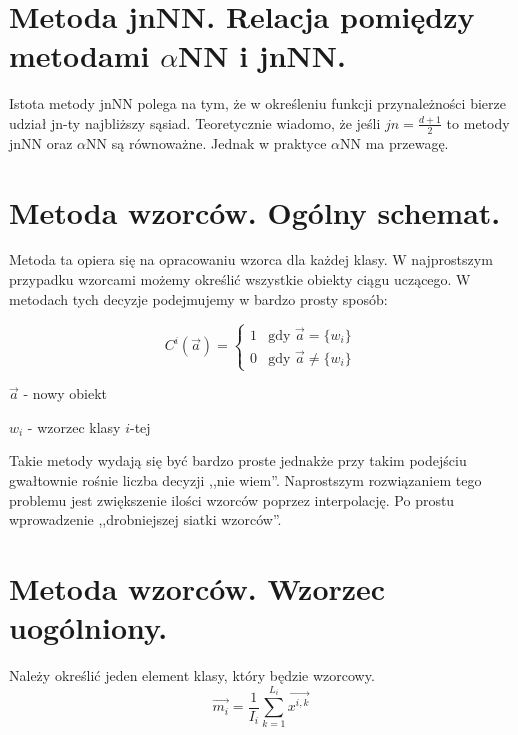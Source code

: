 \documentclass[a4paper,10pt]{article}
\begin{document}
\section{Metoda jnNN. Relacja pomiędzy metodami $\alpha$NN i jnNN.}
Istota metody jnNN polega na tym, że w określeniu funkcji przynależności bierze udział jn-ty najbliższy sąsiad. Teoretycznie wiadomo, że jeśli $jn=\frac{d+1}{2}$ to metody jnNN oraz $\alpha$NN są równoważne. Jednak w praktyce $\alpha$NN ma przewagę.

\section{Metoda wzorców. Ogólny schemat.}
Metoda ta opiera się na opracowaniu wzorca dla każdej klasy. W najprostszym przypadku wzorcami możemy określić wszystkie obiekty ciągu uczącego. W metodach tych decyzje podejmujemy w bardzo prosty sposób:

\begin{equation}
 C^i(\overrightarrow{a}) = 
\begin{cases} 1 & \mbox{gdy }\overrightarrow{a} = \{w_i\}\\
 0 & \mbox{gdy }\overrightarrow{a} \neq \{w_i\}
\end{cases}
\end{equation}

$\overrightarrow{a}$ - nowy obiekt

$w_i$ - wzorzec klasy $i$-tej

Takie metody wydają się być bardzo proste jednakże przy takim podejściu gwałtownie rośnie liczba decyzji ,,nie wiem''.
Naprostszym rozwiązaniem tego problemu jest zwiększenie ilości wzorców poprzez interpolację. Po prostu wprowadzenie ,,drobniejszej siatki wzorców''.

\section{Metoda wzorców. Wzorzec uogólniony.}
Należy określić jeden element klasy, który będzie wzorcowy. 
\begin{equation}
  \overrightarrow{m_i} = \frac{1}{I_i} \sum_{k=1}^{L_i} \overrightarrow{x^{i,k}}
\end{equation}
\end{document}
